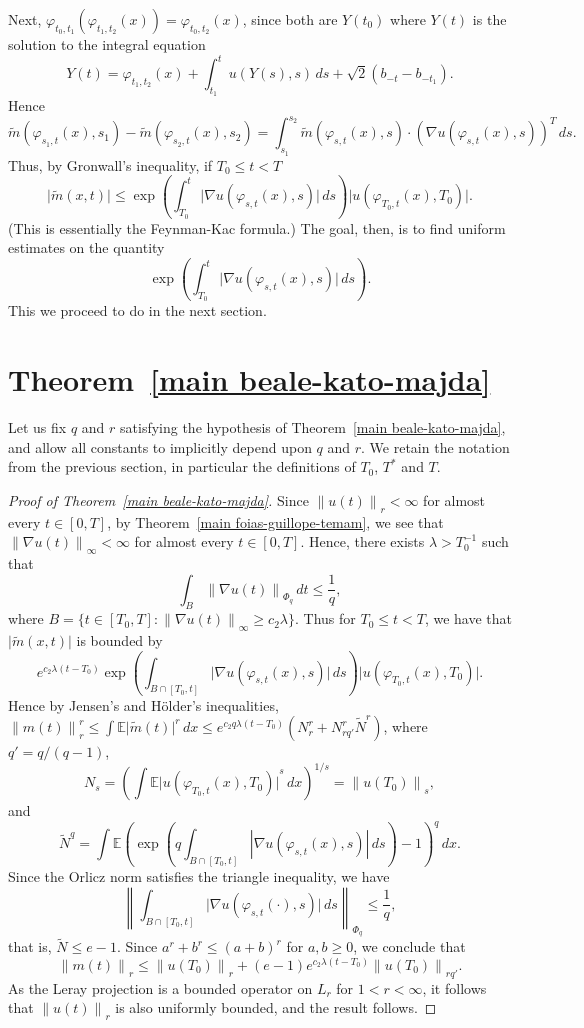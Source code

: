\documentclass[12pt]{amsart}
\theoremstyle{remark}
\newcommand{\E}{{\mathbb E}}
\newcommand{\modo}[1]{{\left|#1\right|}}
\newcommand{\normo}[1]{{\left\|#1\right\|}}
\newcommand{\smodo}[1]{{\mathopen|#1\mathclose|}}
\newcommand{\snormo}[1]{{\mathopen\|#1\mathclose\|}}
\begin{document}
Next, 
$\varphi_{t_0,t_1}(\varphi_{t_1,t_2}(x)) = \varphi_{t_0,t_2}(x)$,
since both are $Y(t_0)$ where $Y(t)$ is the solution to the integral equation
$$ Y(t) = \varphi_{t_1,t_2}(x) + \int_{t_1}^{t} u(Y(s),s)\, ds
       + \sqrt 2(b_{-t}-b_{-t_1}) .$$
Hence
$$ \tilde m(\varphi_{s_1,t}(x),s_1) - \tilde m(\varphi_{s_2,t}(x),s_2)
   =
   \int_{s_1}^{s_2} \tilde 
   m(\varphi_{s,t}(x),s) \cdot (\nabla u(\varphi_{s,t}(x),s))^T \, ds .$$
Thus,
by Gronwall's inequality, if $T_0 \le t < T$
$$ \smodo{\tilde m(x,t)}
   \le
   \exp\left(\int_{T_0}^t \smodo{\nabla u(\varphi_{s,t}(x),s)} \, ds\right)
   \smodo{u(\varphi_{T_0,t}(x),T_0)} .$$
(This is essentially the Feynman-Kac formula.)
The goal, then, is to find uniform estimates on the quantity
$$ \exp\left(\int_{T_0}^t \smodo{\nabla u(\varphi_{s,t}(x),s)} \, ds\right) .$$
This we proceed to do in the next section.

\section{Theorem~\ref{main beale-kato-majda}}

Let us fix $q$ and $r$ satisfying the hypothesis of 
Theorem~\ref{main beale-kato-majda}, 
and allow all constants to implicitly depend upon $q$ and $r$.
We retain the notation from the previous section, in particular the 
definitions of $T_0$, $T^*$ and $T$.

\begin{proof}[Proof of Theorem~\ref{main beale-kato-majda}]
Since $\snormo{u(t)}_r < \infty$ for almost every $t \in [0,T]$, by 
Theorem~\ref{main foias-guillope-temam},
we see that $\snormo{\nabla u(t)}_\infty < \infty$ 
for almost every $t \in [0,T]$.
Hence, there exists $\lambda>T_0^{-1}$ such
that
$$ \int_{B}
   \snormo{\nabla u(t)}_{\Phi_q} \, dt \le \frac1q ,$$
where 
$B = \{t \in [T_0,T] \colon \snormo{\nabla u(t)}_\infty \ge c_2 \lambda\}$.
Thus for $T_0 \le t < T$, we have that $\smodo{\tilde m(x,t)}$ is bounded
by
$$ e^{c_2 \lambda (t-T_0)}
   \exp\left(\int_{B\cap[T_0,t]} 
   \smodo{\nabla u(\varphi_{s,t}(x),s)} \, ds\right)
   \smodo{u(\varphi_{T_0,t}(x),T_0)} .$$
Hence by Jensen's and
H\"older's inequalities, $\snormo{m(t)}_r^r \le 
\int \E\smodo{\tilde m(t)}^r \, dx \le 
e^{c_2 q \lambda (t-T_0)}(N_r^r + N_{rq'}^r \tilde N^r)$, where
$q' = q/(q-1)$, 
$$
   N_s
   =
   \left(\int \E \smodo{u(\varphi_{T_0,t}(x),T_0)}^s\,dx\right)^{1/s} 
   = \snormo{u(T_0)}_s, $$
and
$$
   \tilde N^q
   =
   \int \E \left(
   \exp\left(q\int_{B \cap [T_0,t]}
   \modo{\nabla u(\varphi_{s,t}(x),s)} \, ds \right) - 1 \right)^q
   \, dx .
$$
Since the Orlicz norm satisfies the triangle inequality, we have
$$ \normo{\int_{B\cap[T_0,t]} \smodo{\nabla u(\varphi_{s,t}(\cdot),s)} \, ds}
    _{\Phi_q} \le \frac1q ,$$
that is, $\tilde N \le e-1 $.
Since $a^r + b^r \le (a+b)^r$ for $a,b \ge 0$,
we conclude that 
$$ \snormo{m(t)}_r \le \snormo{u(T_0)}_r + 
   (e-1) e^{c_2 \lambda (t-T_0)} \snormo{u(T_0)}_{rq'} .$$
As the Leray projection is a bounded operator on $L_r$ for $1<r<\infty$,
it follows that $\snormo{u(t)}_r$ is also uniformly bounded,
and the result follows.
\end{proof}
\end{document}
